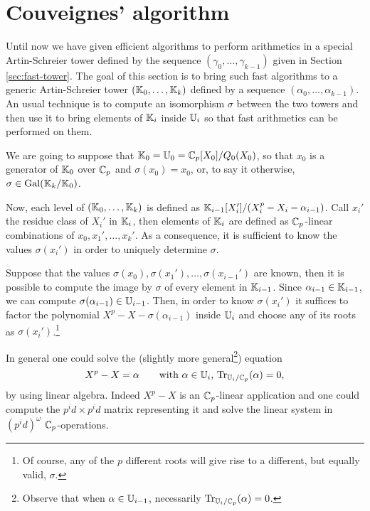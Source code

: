 \section{Couveignes' algorithm}
\label{sec:couveignes-algorithm}

Until now we have given efficient algorithms to perform arithmetics in
a special Artin-Schreier tower defined by the sequence
$(\gamma_0,\ldots,\gamma_{k-1})$ given in Section
\ref{sec:fast-tower}. The goal of this section is to bring such fast
algorithms to a generic Artin-Schreier tower $(\mathbb{K}_0,\ldots,\mathbb{K}_k)$
defined by a sequence $(\alpha_0,\ldots,\alpha_{k-1})$. An usual
technique is to compute an isomorphism $\sigma$ between the two towers
and then use it to bring elements of $\mathbb{K}_i$ inside $\mathbb{U}_i$ so that fast
arithmetics can be performed on them.

We are going to suppose that $\mathbb{K}_0=\mathbb{U}_0=\mathbb{C}_p[X_0]/Q_0(X_0)$, so that
$x_0$ is a generator of $\mathbb{K}_0$ over $\mathbb{C}_p$ and $\sigma(x_0) = x_0$,
or, to say it otherwise, $\sigma\in\operatorname{Gal}(\mathbb{K}_k/\mathbb{K}_0)$.

Now, each level of $(\mathbb{K}_0,\ldots,\mathbb{K}_k)$ is defined as
$\mathbb{K}_{i-1}[X_i']/(X_i^p - X_i - \alpha_{i-1})$. Call $x_i'$ the residue
class of $X_i'$ in $\mathbb{K}_i$, then elements of $\mathbb{K}_i$ are defined as
$\mathbb{C}_p$-linear combinations of $x_0,x_1',\ldots,x_k'$. As a
consequence, it is sufficient to know the values $\sigma(x_i')$ in
order to uniquely determine $\sigma$.

Suppose that the values $\sigma(x_0), \sigma(x_1'), \ldots,
\sigma(x_{i-1}')$ are known, then it is possible to compute the image
by $\sigma$ of every element in $\mathbb{K}_{i-1}$. Since
$\alpha_{i-1}\in\mathbb{K}_{i-1}$, we can compute
$\sigma(\alpha_{i-1})\in\mathbb{U}_{i-1}$. Then, in order to know
$\sigma(x_i')$ it suffices to factor the polynomial
$X^p-X-\sigma(\alpha_{i-1})$ inside $\mathbb{U}_i$ and choose any of its roots
as $\sigma(x_i')$.\footnote{Of course, any of the $p$ different roots
  will give rise to a different, but equally valid, $\sigma$.}

In general one could solve the (slightly more general\footnote{Observe
  that when $\alpha\in\mathbb{U}_{i-1}$, necessarily $\operatorname{Tr}_{\mathbb{U}_i/\mathbb{C}_p}(\alpha)
  = 0$.}) equation
\begin{equation}
  \label{eq:AS}
  X^p-X=\alpha \qquad
  \text{with $\alpha\in\mathbb{U}_i$, $\operatorname{Tr}_{\mathbb{U}_i/\mathbb{C}_p}(\alpha)=0$,}
\end{equation}
by using linear algebra. Indeed $X^p-X$ is an $\mathbb{C}_p$-linear
application and one could compute the $p^id\times p^id$ matrix
representing it and solve the linear system in
$\left(p^id\right)^\omega$ $\mathbb{C}_p$-operations.

